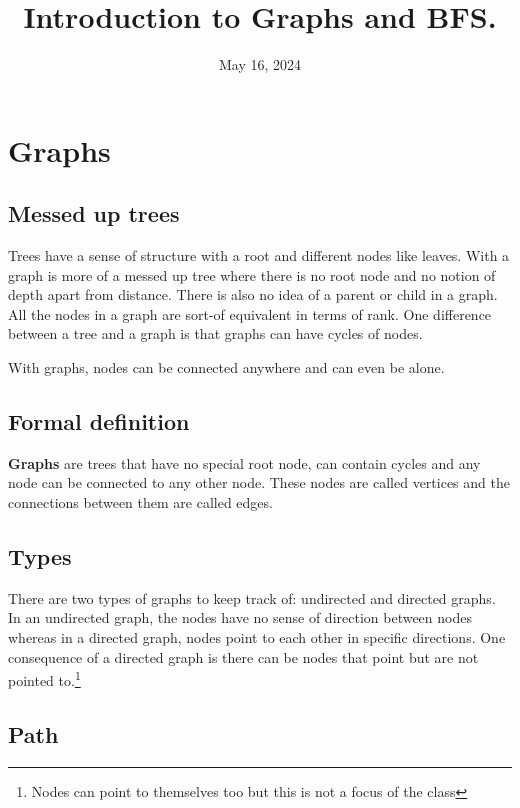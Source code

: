 \documentclass[11pt,a4paper,english]{article}
\begin{document}
\title{Introduction to Graphs and BFS.}

\date{May 16, 2024}
\maketitle

\tableofcontents

\section{Graphs}

\subsection{Messed up trees}

Trees have a sense of structure with a root and different nodes like leaves. With a graph is more of a messed up tree where there is no root node and no notion of depth apart from distance. There is also no idea of a parent or child in a graph. All the nodes in a graph are sort-of equivalent in terms of rank. One difference between a tree and a graph is that graphs can have cycles of nodes.

\bigskip
\noindent With graphs, nodes can be connected anywhere and can even be alone.

\subsection{Formal definition}

\textbf{Graphs} are trees that have no special root node, can contain cycles and any node can be connected to any other node. These nodes are called vertices and the connections between them are called edges.

\subsection{Types}

There are two types of graphs to keep track of: undirected and directed graphs. In an undirected graph, the nodes have no sense of direction between nodes whereas in a directed graph, nodes point to each other in specific directions. One consequence of a directed graph is there can be nodes that point but are not pointed to.\footnote{Nodes can point to themselves too but this is not a focus of the class}

\subsection{Path}
\end{document}
